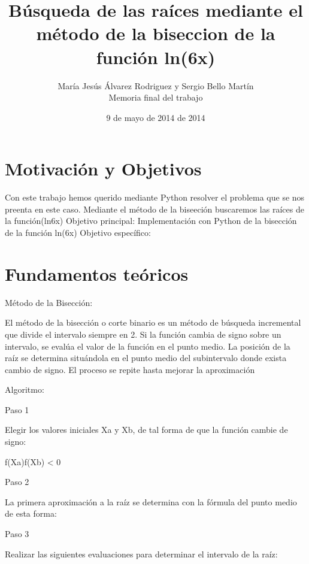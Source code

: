 \documentclass[spanish,a4paper,10pt]{article}
\begin{document}
\title{Búsqueda de las raíces mediante el método de la biseccion de la función ln(6x)}
\author{María Jesús Álvarez Rodriguez y Sergio Bello Martín \\ Memoria final del trabajo}
\date{9 de mayo de 2014 de 2014}

\maketitle

\begin{abstract}


\end{abstract}

\section{Motivación y Objetivos}
Con este trabajo hemos querido mediante Python resolver el problema que se nos preenta en este caso. Mediante
el método de la biseeción buscaremos las raíces de la función(ln6x)
Objetivo principal: Implementación con Python de la bisección de la función ln(6x)
Objetivo específico:

\section{Fundamentos teóricos}
Método de la Bisección:

 El método de la bisección o corte binario es un método de búsqueda incremental que divide el intervalo siempre en 2. Si la función cambia de signo sobre un intervalo, se evalúa el valor
 de la función en el punto medio. La posición de la raíz se determina situándola en el punto medio del subintervalo donde exista cambio de signo. El proceso se repite hasta mejorar la
 aproximación

Algoritmo:

 Paso 1

  Elegir los valores iniciales Xa y Xb, de tal forma de que la función cambie de signo:

  f(Xa)f(Xb) < 0

 Paso 2

  La primera aproximación a la raíz se determina con la fórmula del punto medio de esta forma:

 Paso 3

  Realizar las siguientes evaluaciones para determinar el intervalo de la raíz:
\end{document}
